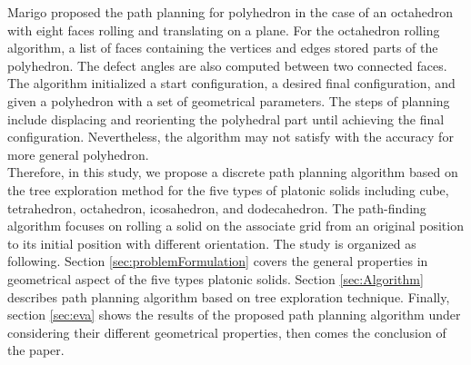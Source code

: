 \noindent Marigo \cite{Marigo00_PlanningMotion_Polyhedra_Rolling} proposed the path planning for polyhedron in the case of an octahedron with eight faces rolling and translating on a plane. 
For the octahedron rolling algorithm, a list of faces containing the vertices and edges stored parts of the polyhedron. 
The defect angles are also computed between two connected faces.
The algorithm initialized a start configuration, a desired final configuration, and given a polyhedron with a set of geometrical parameters. 
The steps of planning include displacing and reorienting the polyhedral part until achieving the final configuration. Nevertheless, the algorithm may not satisfy with the accuracy for more general polyhedron.\\

\noindent Therefore, in this study, we propose a discrete path planning algorithm based on the tree exploration method for the five types of platonic solids including cube, tetrahedron, octahedron, icosahedron, and dodecahedron. The path-finding algorithm focuses on rolling a solid on the associate grid from an original position to its initial position with different orientation. 
%
The study is organized as following. Section \ref{sec:problemFormulation} covers the general properties in geometrical aspect of the five types platonic solids. Section \ref{sec:Algorithm} describes path planning algorithm based on tree exploration technique. Finally, section \ref{sec:eva} shows the results of the proposed path planning algorithm under considering their different geometrical properties, then comes the conclusion of the paper.

